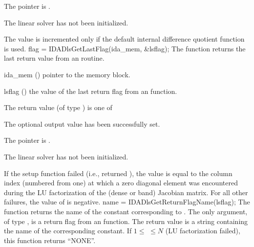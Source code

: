 {{\begin{args}
  \item[\Id{IDADLS\_MEM\_NULL}]
    The  pointer is .
  \item[\Id{IDADLS\_LMEM\_NULL}]
    The {\idadense} linear solver has not been initialized.
  \end{args}
}
{
  The value  is incremented only if the default 
  internal difference quotient function is used.
}
{
  flag = IDADlsGetLastFlag(ida\_mem, \&lsflag);
}
{
  The function  returns the
  last return value from an {\idadls} routine. 
}
{
  \begin{args}
  \item[ida\_mem] ()
    pointer to the {\idas} memory block.
  \item[lsflag] ()
    the value of the last return flag from an {\idadls} function.
  \end{args}
}
{
  The return value  (of type ) is one of
  \begin{args}
  \item[\Id{IDADLS\_SUCCESS}] 
    The optional output value has been successfully set.
  \item[\Id{IDADLS\_MEM\_NULL}]
    The  pointer is .
  \item[\Id{IDADLS\_LMEM\_NULL}]
    The {\idadense} linear solver has not been initialized.
  \end{args}
}
{
  If the {\idadense} setup function failed (i.e.,  returned
  ), the value  is equal to the column index
  (numbered from one) at which a zero diagonal element was encountered during
  the LU factorization of the (dense or band) Jacobian matrix.
  For all other failures, the value of  is negative.
}
{
  name = IDADlsGetReturnFlagName(lsflag);
}
{
  The function  returns the
  name of the {\idadls} constant corresponding to .
}
{
  The only argument, of type , is a return flag from an {\idadls} function.
}
{
  The return value is a string containing the name of the corresponding
  constant.  If $1 \leq $  $ \leq N$ (LU factorization failed), this
  function returns ``NONE''.
}
{}

}
